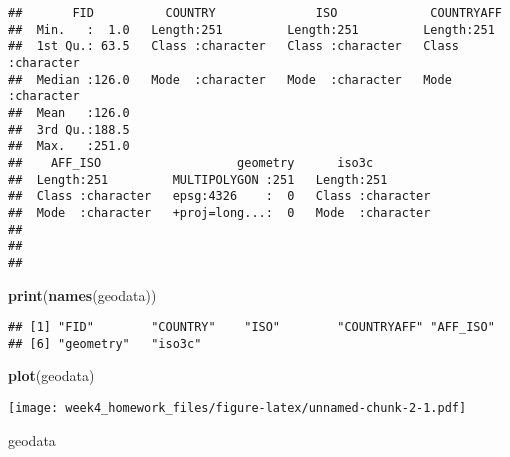 \documentclass[
]{article}
\newenvironment{Shaded}{\begin{snugshade}}{\end{snugshade}}
\newcommand{\FunctionTok}[1]{\textcolor[rgb]{0.13,0.29,0.53}{\textbf{#1}}}
\newcommand{\NormalTok}[1]{#1}
\begin{document}
\begin{verbatim}
##       FID          COUNTRY              ISO             COUNTRYAFF       
##  Min.   :  1.0   Length:251         Length:251         Length:251        
##  1st Qu.: 63.5   Class :character   Class :character   Class :character  
##  Median :126.0   Mode  :character   Mode  :character   Mode  :character  
##  Mean   :126.0                                                           
##  3rd Qu.:188.5                                                           
##  Max.   :251.0                                                           
##    AFF_ISO                   geometry      iso3c          
##  Length:251         MULTIPOLYGON :251   Length:251        
##  Class :character   epsg:4326    :  0   Class :character  
##  Mode  :character   +proj=long...:  0   Mode  :character  
##                                                           
##                                                           
## 
\end{verbatim}

\begin{Shaded}
\begin{Highlighting}[]
\FunctionTok{print}\NormalTok{(}\FunctionTok{names}\NormalTok{(geodata))}
\end{Highlighting}
\end{Shaded}

\begin{verbatim}
## [1] "FID"        "COUNTRY"    "ISO"        "COUNTRYAFF" "AFF_ISO"   
## [6] "geometry"   "iso3c"
\end{verbatim}

\begin{Shaded}
\begin{Highlighting}[]
\FunctionTok{plot}\NormalTok{(geodata)}
\end{Highlighting}
\end{Shaded}

\texttt{[image: week4\_homework\_files/figure-latex/unnamed-chunk-2-1.pdf]}

\begin{Shaded}
\begin{Highlighting}[]
\NormalTok{geodata}
\end{Highlighting}
\end{Shaded}
\end{document}
